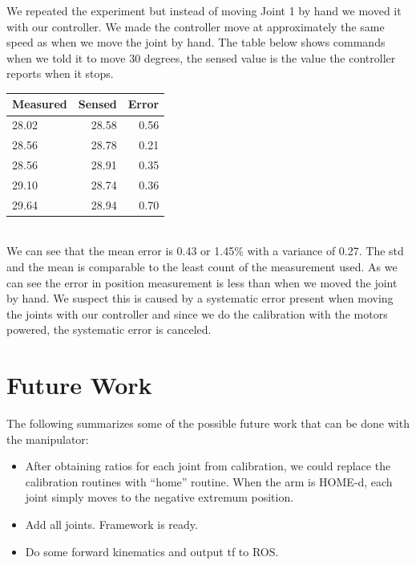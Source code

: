\documentclass[10pt,a4paper]{article}
\begin{document}
We repeated the experiment but instead of moving Joint 1 by hand we moved it with our controller. We made the controller move at approximately the same speed as when we move the joint by hand. The table below shows commands when we told it to move 30 degrees, the sensed value is the value the controller reports when it stops. \\

\begin{tabular}{ | l | r | r |}
\hline
\textbf{Measured} & \textbf{Sensed} & \textbf{Error} \\
\hline
 28.02 & 28.58 & 0.56  \\
\hline
 28.56	& 28.78 & 0.21 \\
\hline
 28.56 & 28.91 & 0.35 \\
\hline
 29.10 & 28.74 & 0.36 \\
\hline
 29.64 & 28.94 & 0.70\\
\hline
\end{tabular} \\

We can see that the mean error is 0.43 or 1.45\% with a variance of 0.27. The std and the mean is comparable to the least count of the measurement used.
As we can see the error in position measurement is less than when we moved the joint by hand. We suspect this is caused by a systematic error present when moving the joints with our controller and since we do the calibration with the motors powered, the systematic error is canceled.

\section{Future Work}

The following summarizes some of the possible future work that can be
done with the manipulator: 

\begin{itemize}
\item After obtaining ratios for each joint from calibration, we could
  replace the calibration routines with ``home'' routine. When the arm
  is HOME-d, each joint simply moves to the negative extremum
  position. 
\item Add all joints. Framework is ready.
\item Do some forward kinematics and output tf to ROS.
\end{itemize}



\end{document}
